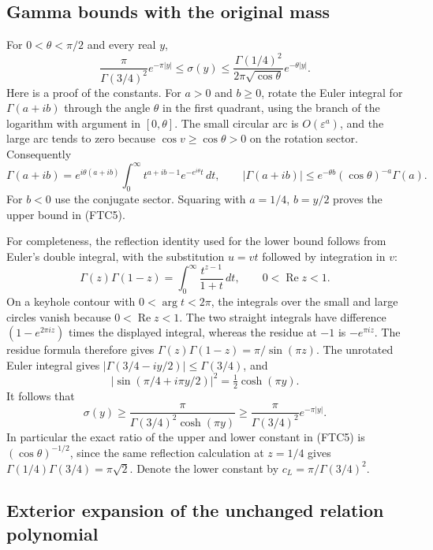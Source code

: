 \documentclass[11pt,a4paper]{article}
\begin{document}
\subsection{Gamma bounds with the original mass}

For $0<\theta<\pi/2$ and every real $y$,
\begin{equation}
 \frac{\pi}{\Gamma(3/4)^2}e^{-\pi|y|}
 \le\sigma(y)\le
 \frac{\Gamma(1/4)^2}{2\pi\sqrt{\cos\theta}}
 e^{-\theta|y|}.
 \tag{FTC5}
\end{equation}
Here is a proof of the constants.  For $a>0$ and $b\ge0$, rotate the
Euler integral for $\Gamma(a+ib)$ through the angle $\theta$ in the first
quadrant, using the branch of the logarithm with argument in $[0,\theta]$.
The small circular arc is $O(\varepsilon^a)$, and the large arc tends to
zero because $\cos v\ge\cos\theta>0$ on the rotation sector.  Consequently
\[
 \Gamma(a+ib)=e^{i\theta(a+ib)}
 \int_0^\infty t^{a+ib-1}e^{-e^{i\theta}t}\,dt,
 \qquad
 |\Gamma(a+ib)|\le e^{-\theta b}
 (\cos\theta)^{-a}\Gamma(a).
\]
For $b<0$ use the conjugate sector.  Squaring with $a=1/4$, $b=y/2$
proves the upper bound in (FTC5).

For completeness, the reflection identity used for the lower bound follows
from Euler's double integral, with the substitution $u=vt$ followed by
integration in $v$:
\[
 \Gamma(z)\Gamma(1-z)=\int_0^\infty\frac{t^{z-1}}{1+t}\,dt,
 \qquad 0<\operatorname{Re}z<1.
\]
On a keyhole contour with $0<\arg t<2\pi$, the integrals over the small
and large circles vanish because $0<\operatorname{Re}z<1$.  The two
straight integrals have difference $(1-e^{2\pi iz})$ times the displayed
integral, whereas the residue at $-1$ is $-e^{\pi iz}$.  The residue formula
therefore gives $\Gamma(z)\Gamma(1-z)=\pi/\sin(\pi z)$.
The unrotated Euler integral gives
$|\Gamma(3/4-iy/2)|\le\Gamma(3/4)$, and
\[
 |\sin(\pi/4+i\pi y/2)|^2=\tfrac12\cosh(\pi y).
\]
It follows that
\[
 \sigma(y)\ge\frac{\pi}{\Gamma(3/4)^2\cosh(\pi y)}
 \ge\frac{\pi}{\Gamma(3/4)^2}e^{-\pi|y|}.
\]
In particular the exact ratio of the upper and lower constant in (FTC5)
is $(\cos\theta)^{-1/2}$, since the same reflection calculation at $z=1/4$
gives $\Gamma(1/4)\Gamma(3/4)=\pi\sqrt2$.  Denote the lower constant by
$c_L=\pi/\Gamma(3/4)^2$.

\subsection{Exterior expansion of the unchanged relation polynomial}
\end{document}

